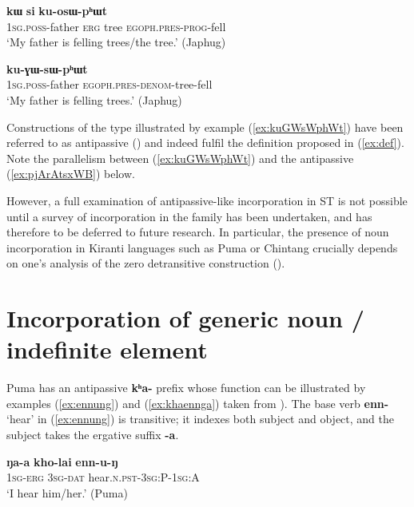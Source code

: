 \documentclass[oneside,a4paper,11pt]{article}
\newcommand{\ipa}[1]{{\phon\textbf{#1}}}
\begin{document}
 
\begin{exe}
\ex \label{ex:kosWphWt}
\gll \ipa{a-wa} \ipa{kɯ} \ipa{si} \ipa{ku-osɯ-pʰɯt} \\
\textsc{1sg.poss}-father \textsc{erg} tree \textsc{egoph.pres-prog}-fell \\
\glt `My father is felling trees/the tree.' (Japhug)
\end{exe}	 

\begin{exe}
\ex   \label{ex:kuGWsWphWt}
\gll \ipa{a-wa} \ipa{ku-ɣɯ-sɯ-pʰɯt} \\
\textsc{1sg.poss}-father \textsc{egoph.pres-denom}-tree-fell \\
\glt `My father is felling trees.' (Japhug)
\end{exe}	 

Constructions of the type illustrated by example (\ref{ex:kuGWsWphWt}) have been referred to as antipassive (\citealt[47-48]{say09antipassive}) and indeed fulfil the definition proposed in (\ref{ex:def}). Note the parallelism between (\ref{ex:kuGWsWphWt}) and the antipassive (\ref{ex:pjArAtsxWB}) below.

However, a full examination of antipassive-like incorporation in ST is not possible until a survey of incorporation in the family has been undertaken, and has therefore to be deferred to future research. In particular, the presence of noun incorporation in Kiranti languages such as Puma or Chintang crucially depends on one's analysis of the zero detransitive construction (\citealt{bickel11multivariate}).

 
\section{Incorporation of generic noun / indefinite element} \label{sec:kha}
Puma has an antipassive \ipa{kʰa-} prefix whose function can be illustrated by examples (\ref{ex:ennung}) and (\ref{ex:khaennga}) taken from \citet[7-9]{bickel07puma}). The base verb \ipa{enn-} `hear' in (\ref{ex:ennung}) is transitive; it indexes both subject and object, and the subject takes the ergative suffix \ipa{-a}.

\begin{exe}
\ex \label{ex:ennung}
\gll 
\ipa{ŋa-a} \ipa{kho-lai} \ipa{enn-u-ŋ} \\
\textsc{1sg-erg} \textsc{3sg-dat} hear.\textsc{n.pst}-\textsc{3sg:P-1sg:A} \\
\glt `I hear him/her.' (Puma)
\end{exe}
\end{document}
